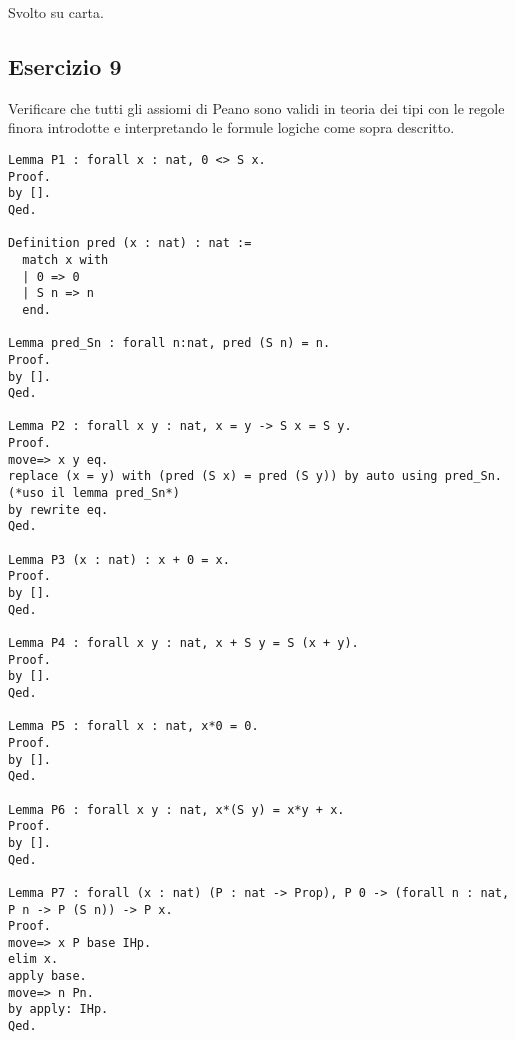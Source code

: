 Svolto su carta.

\subsection{Esercizio 9}

Verificare che tutti gli assiomi di Peano sono validi in teoria dei tipi con le
regole finora introdotte e interpretando le formule logiche come sopra
descritto.

\begin{lstlisting}[language=Coq]
Lemma P1 : forall x : nat, 0 <> S x.
Proof.
by [].
Qed.

Definition pred (x : nat) : nat :=
  match x with
  | 0 => 0
  | S n => n
  end.

Lemma pred_Sn : forall n:nat, pred (S n) = n.
Proof.
by [].
Qed.

Lemma P2 : forall x y : nat, x = y -> S x = S y.
Proof.
move=> x y eq.
replace (x = y) with (pred (S x) = pred (S y)) by auto using pred_Sn. (*uso il lemma pred_Sn*)
by rewrite eq.
Qed.

Lemma P3 (x : nat) : x + 0 = x.
Proof.
by [].
Qed.

Lemma P4 : forall x y : nat, x + S y = S (x + y).
Proof.
by [].
Qed.

Lemma P5 : forall x : nat, x*0 = 0.
Proof.
by [].
Qed.

Lemma P6 : forall x y : nat, x*(S y) = x*y + x.
Proof.
by [].
Qed.

Lemma P7 : forall (x : nat) (P : nat -> Prop), P 0 -> (forall n : nat, P n -> P (S n)) -> P x.
Proof.
move=> x P base IHp.
elim x.
apply base.
move=> n Pn.
by apply: IHp.
Qed.
\end{lstlisting}
